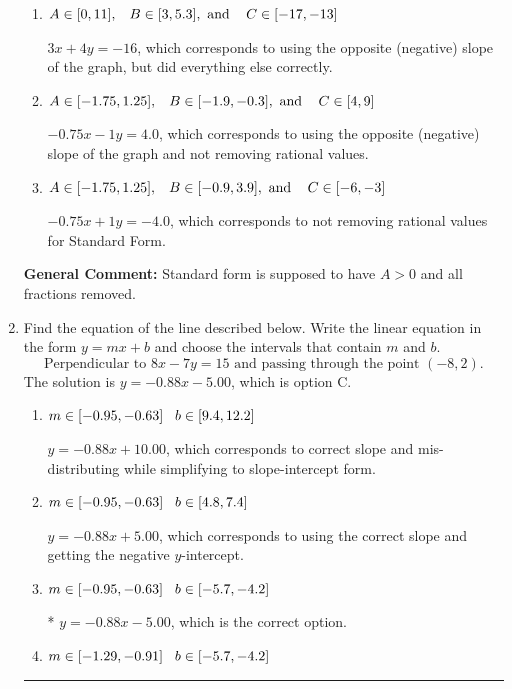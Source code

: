 \documentclass{extbook}[14pt]
\newcommand{\litem}[1]{\item #1

\rule{\textwidth}{0.4pt}}
\begin{document}
\begin{enumerate}
{\begin{enumerate}[label=\Alph*.]
 $-3x + 4y = -16$, which corresponds to not making $A$ positive (by multiplying the equation by $-1$).
\item \( A \in [0, 11], \hspace{3mm} B \in [3, 5.3], \text{ and } \hspace{3mm} C \in [-17, -13] \)

 $3x + 4y = -16$, which corresponds to using the opposite (negative) slope of the graph, but did everything else correctly.
\item \( A \in [-1.75, 1.25], \hspace{3mm} B \in [-1.9, -0.3], \text{ and } \hspace{3mm} C \in [4, 9] \)

 $-0.75x - 1y = 4.0$, which corresponds to using the opposite (negative) slope of the graph and not removing rational values.
\item \( A \in [-1.75, 1.25], \hspace{3mm} B \in [-0.9, 3.9], \text{ and } \hspace{3mm} C \in [-6, -3] \)

 $-0.75x + 1y = -4.0$, which corresponds to not removing rational values for Standard Form.
\end{enumerate}

\textbf{General Comment:} Standard form is supposed to have $A > 0$ and all fractions removed.
}
\litem{
Find the equation of the line described below. Write the linear equation in the form $ y=mx+b $ and choose the intervals that contain $m$ and $b$.
\[ \text{Perpendicular to } 8 x - 7 y = 15 \text{ and passing through the point } (-8, 2). \]The solution is \( y = -0.88x - 5.00 \), which is option C.\begin{enumerate}[label=\Alph*.]
\item \( m \in [-0.95, -0.63] \hspace*{3mm} b \in [9.4, 12.2] \)

 $y = -0.88x + 10.00$, which corresponds to correct slope and mis-distributing while simplifying to slope-intercept form.
\item \( m \in [-0.95, -0.63] \hspace*{3mm} b \in [4.8, 7.4] \)

 $y = -0.88x + 5.00$, which corresponds to using the correct slope and getting the negative $y$-intercept.
\item \( m \in [-0.95, -0.63] \hspace*{3mm} b \in [-5.7, -4.2] \)

* $y = -0.88x - 5.00$, which is the correct option.
\item \( m \in [-1.29, -0.91] \hspace*{3mm} b \in [-5.7, -4.2] \)


\end{enumerate}}
\end{enumerate}
\end{document}
